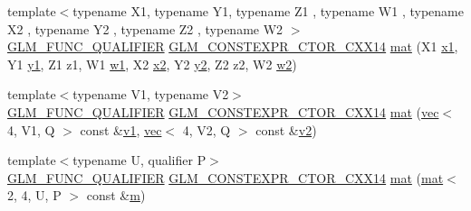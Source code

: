\begin{DoxyCompactItemize}
{\footnotesize template$<$typename X1, typename Y1, typename Z1 , typename W1 , typename X2 , typename Y2 , typename Z2 , typename W2 $>$ }\\\mbox{\hyperlink{setup_8hpp_a33fdea6f91c5f834105f7415e2a64407}{G\+L\+M\+\_\+\+F\+U\+N\+C\+\_\+\+Q\+U\+A\+L\+I\+F\+I\+ER}} \mbox{\hyperlink{setup_8hpp_a0900f9145e68bf6061b6f5e7be3fa751}{G\+L\+M\+\_\+\+C\+O\+N\+S\+T\+E\+X\+P\+R\+\_\+\+C\+T\+O\+R\+\_\+\+C\+X\+X14}} \mbox{\hyperlink{structglm_1_1mat_3_012_00_014_00_01_t_00_01_q_01_4_a6d81f6d524f14f933d44911cc8049b01}{mat}} (X1 \mbox{\hyperlink{_s_d_l__opengl__glext_8h_a49825216c96caaeb09237b36651181c5}{x1}}, Y1 \mbox{\hyperlink{_s_d_l__opengl__glext_8h_a3af6c78fcdfccea028a5878bc747ef39}{y1}}, Z1 z1, W1 \mbox{\hyperlink{_s_d_l__opengl__glext_8h_ab5b747bf5adb1f9134337c30b9a4ce84}{w1}}, X2 \mbox{\hyperlink{_s_d_l__opengl__glext_8h_a7b907a03236685c534d89d604cff23c8}{x2}}, Y2 \mbox{\hyperlink{_s_d_l__opengl__glext_8h_a2be1135ed68e8d80fa9e130c7814f8c2}{y2}}, Z2 z2, W2 \mbox{\hyperlink{_s_d_l__opengl__glext_8h_a1ca5aca787be24213d9591fdf074b094}{w2}})
\item 
{\footnotesize template$<$typename V1, typename V2$>$ }\\\mbox{\hyperlink{setup_8hpp_a33fdea6f91c5f834105f7415e2a64407}{G\+L\+M\+\_\+\+F\+U\+N\+C\+\_\+\+Q\+U\+A\+L\+I\+F\+I\+ER}} \mbox{\hyperlink{setup_8hpp_a0900f9145e68bf6061b6f5e7be3fa751}{G\+L\+M\+\_\+\+C\+O\+N\+S\+T\+E\+X\+P\+R\+\_\+\+C\+T\+O\+R\+\_\+\+C\+X\+X14}} \mbox{\hyperlink{structglm_1_1mat_3_012_00_014_00_01_t_00_01_q_01_4_a727b28490a4fbcaa1cf57cc335d1205d}{mat}} (\mbox{\hyperlink{structglm_1_1vec}{vec}}$<$ 4, V1, Q $>$ const \&\mbox{\hyperlink{_s_d_l__opengl__glext_8h_a435c176a02c061b43e19bdf7c86cceae}{v1}}, \mbox{\hyperlink{structglm_1_1vec}{vec}}$<$ 4, V2, Q $>$ const \&\mbox{\hyperlink{_s_d_l__opengl__glext_8h_a0928f6d0f0f794ba000a21dfae422136}{v2}})
\item 
{\footnotesize template$<$typename U, qualifier P$>$ }\\\mbox{\hyperlink{setup_8hpp_a33fdea6f91c5f834105f7415e2a64407}{G\+L\+M\+\_\+\+F\+U\+N\+C\+\_\+\+Q\+U\+A\+L\+I\+F\+I\+ER}} \mbox{\hyperlink{setup_8hpp_a0900f9145e68bf6061b6f5e7be3fa751}{G\+L\+M\+\_\+\+C\+O\+N\+S\+T\+E\+X\+P\+R\+\_\+\+C\+T\+O\+R\+\_\+\+C\+X\+X14}} \mbox{\hyperlink{structglm_1_1mat_3_012_00_014_00_01_t_00_01_q_01_4_a0fba6a2c0edf428cb93057e2eca9f7ad}{mat}} (\mbox{\hyperlink{structglm_1_1mat}{mat}}$<$ 2, 4, U, P $>$ const \&\mbox{\hyperlink{_s_d_l__opengl__glext_8h_af593500c283bf1a787a6f947f503a5c2}{m}})
\item 

\end{DoxyCompactItemize}
